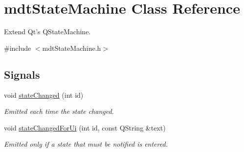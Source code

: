 \hypertarget{classmdt_state_machine}{
\section{mdtStateMachine Class Reference}
\label{classmdt_state_machine}
}


Extend Qt's QStateMachine.  




{\ttfamily \#include $<$mdtStateMachine.h$>$}

\subsection*{Signals}
\begin{DoxyCompactItemize}
\item 
\hypertarget{classmdt_state_machine_a57952ce2e02e44a57c70695067dc8b86}{
void \hyperlink{classmdt_state_machine_a57952ce2e02e44a57c70695067dc8b86}{stateChanged} (int id)}
\label{classmdt_state_machine_a57952ce2e02e44a57c70695067dc8b86}

\begin{DoxyCompactList}\small\item\em Emitted each time the state changed. \end{DoxyCompactList}\item 
void \hyperlink{classmdt_state_machine_ace677654f9ef9d7c1620c1c9f740ae0b}{stateChangedForUi} (int id, const QString \&text)
\begin{DoxyCompactList}\small\item\em Emitted only if a state that must be notified is entered. \end{DoxyCompactList}\end{DoxyCompactItemize}
